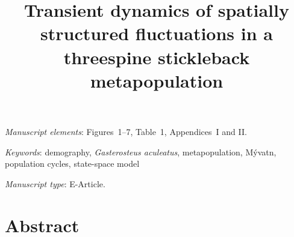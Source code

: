 \documentclass[11pt]{article}
\title{Transient dynamics of spatially structured fluctuations 
        in a threespine stickleback metapopulation}
\date{}
\begin{document}
\maketitle

\bigskip

\textit{Manuscript elements}: Figures~1--7, Table~1, Appendices~I and II. 

\bigskip

\textit{Keywords}: {demography, \textit{Gasterosteus aculeatus}, metapopulation,
                    M\'{y}vatn, population cycles, state-space model}
                    
\bigskip

\textit{Manuscript type}: E-Article. 

\bigskip


\linenumbers{}

\newpage{}






\section*{Abstract} \label{abstract}
\end{document}
